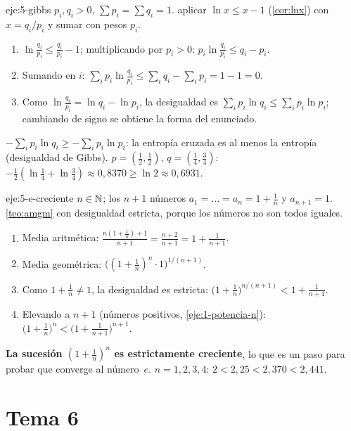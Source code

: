 \begin{solucion}{eje:5-gibbs}
\datos $p_i,q_i>0$, $\sum p_i=\sum q_i=1$.
\planteamiento aplicar $\ln x\le x-1$ (\cref{cor:lnx}) con $x=q_i/p_i$ y sumar con pesos $p_i$.
\pasos
\begin{enumerate}[label=\arabic*.]
  \item $\ln\frac{q_i}{p_i}\le\frac{q_i}{p_i}-1$; multiplicando por $p_i>0$: $p_i\ln\frac{q_i}{p_i}\le q_i-p_i$.
  \item Sumando en $i$: $\sum_ip_i\ln\frac{q_i}{p_i}\le\sum_iq_i-\sum_ip_i=1-1=0$.
  \item Como $\ln\frac{q_i}{p_i}=\ln q_i-\ln p_i$, la desigualdad es $\sum_ip_i\ln q_i\le\sum_ip_i\ln p_i$; cambiando de signo se obtiene la forma del enunciado.
\end{enumerate}
\resultado \textbf{$-\sum_ip_i\ln q_i\ge-\sum_ip_i\ln p_i$}: la entropía cruzada es al menos la entropía (desigualdad de Gibbs).
\comprobacion $p=(\frac12,\frac12)$, $q=(\frac14,\frac34)$: $-\frac12(\ln\frac14+\ln\frac34)\approx0{,}8370\ge\ln2\approx0{,}6931$.
\end{solucion}

\begin{solucion}{eje:5-e-creciente}
\datos $n\in\mathbb{N}$; los $n+1$ números $a_1=\dots=a_n=1+\frac1n$ y $a_{n+1}=1$.
\planteamiento \cref{teo:amgm} con desigualdad estricta, porque los números no son todos iguales.
\pasos
\begin{enumerate}[label=\arabic*.]
  \item Media aritmética: $\frac{n(1+\frac1n)+1}{n+1}=\frac{n+2}{n+1}=1+\frac1{n+1}$.
  \item Media geométrica: $\bigl((1+\frac1n)^n\cdot1\bigr)^{1/(n+1)}$.
  \item Como $1+\frac1n\neq1$, la desigualdad es estricta: $\bigl(1+\frac1n\bigr)^{n/(n+1)}<1+\frac1{n+1}$.
  \item Elevando a $n+1$ (números positivos, \cref{eje:1-potencia-n}): $\bigl(1+\frac1n\bigr)^n<\bigl(1+\frac1{n+1}\bigr)^{n+1}$.
\end{enumerate}
\resultado \textbf{La sucesión $(1+\frac1n)^n$ es estrictamente creciente}, lo que es un paso para probar que converge al número~$e$.
\comprobacion $n=1,2,3,4$: $2<2{,}25<2{,}370<2{,}441$.
\end{solucion}
\section{Tema 6}

